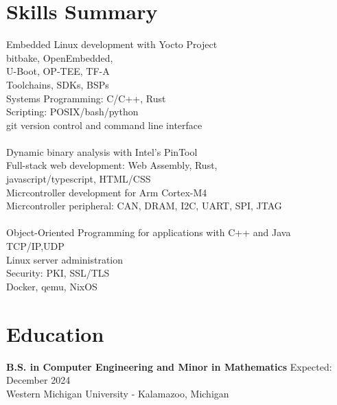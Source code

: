 \documentclass[letter,12pt]{article}
\begin{document}
\section*{Skills Summary}
\vspace{-.5cm}
\begin{tcolorbox}
  [colback=gray!25,
  leftrule=0pt,
  rightrule=0pt,
  sharp corners]
\vspace{-.125cm}
  \begin{multicols}{3}
  \textbullet \- Embedded Linux development with Yocto Project\\
  \textbullet \- bitbake, OpenEmbedded, \\
    U-Boot, OP-TEE, TF-A\\
  \textbullet \- Toolchains, SDKs, BSPs \\
  \textbullet \- Systems Programming: C/C++, Rust \\
  \textbullet \- Scripting: POSIX/bash/python \\
  \textbullet \- git version control and command line interface \\
  \columnbreak\\
  \textbullet \- Dynamic binary analysis with Intel's PinTool\\
  \textbullet \- Full-stack web development: Web Assembly, Rust,\\
    javascript/typescript, HTML/CSS\\
  \textbullet \- Micrcontroller development for Arm Cortex-M4\\
  \textbullet \- Micrcontroller peripheral: CAN, DRAM, I2C, UART, SPI, JTAG\\
  \columnbreak\\
  \textbullet \- Object-Oriented Programming for applications 
    with C++ and Java \\
  \textbullet \- TCP/IP,UDP \\
  \textbullet \- Linux server administration \\
  \textbullet \- Security: PKI, SSL/TLS\\
  \textbullet \- Docker, qemu, NixOS\\
  \end{multicols}
    
\vspace{-1.00cm}
\end{tcolorbox}

\vspace{-0.50cm}
\section*{Education} 
\vspace{-.25cm}
\textbf{B.S. in Computer Engineering and Minor in Mathematics} 
\hfill Expected: December 2024\\
Western Michigan University - Kalamazoo, Michigan\\ 
\end{document}
